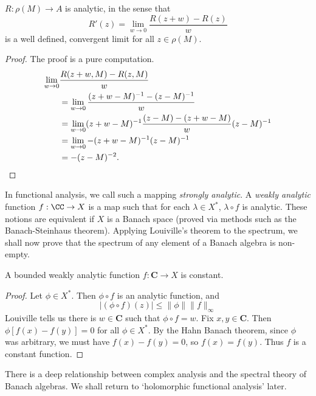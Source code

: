 \begin{lemma}
    $R: \rho(M) \to A$ is analytic, in the sense that
    \[ R'(z) = \lim_{w \to 0} \frac{R(z + w) - R(z)}{w} \]
    is a well defined, convergent limit for all $z \in \rho(M)$.
\end{lemma}
\begin{proof}
    The proof is a pure computation.
    \begin{align*}
        \lim_{w \to 0} &\frac{R(z + w, M) - R(z,M)}{w}\\
        &= \lim_{w \to 0} \frac{(z + w - M)^{-1} - (z - M)^{-1}}{w}\\
        &= \lim_{w \to 0} (z + w - M)^{-1} \frac{(z - M) - (z + w - M)}{w} (z - M)^{-1}\\
        &= \lim_{w \to 0} -(z + w - M)^{-1} (z - M)^{-1}\\
        &= -(z - M)^{-2}. \qedhere
    \end{align*}
\end{proof}

In functional analysis, we call such a mapping \emph{strongly analytic}. A \emph{weakly analytic} function $f: \CC \to X$ is a map such that for each $\lambda \in X^*$, $\lambda \circ f$ is analytic. These notions are equivalent if $X$ is a Banach space (proved via methods such as the Banach-Steinhaus theorem). Applying Louiville's theorem to the spectrum, we shall now prove that the spectrum of any element of a Banach algebra is non-empty.

\begin{lemma}
    A bounded weakly analytic function $f: \mathbf{C} \to X$ is constant.
\end{lemma}
\begin{proof}
    Let $\phi \in X^*$. Then $\phi \circ f$ is an analytic function, and
    \[ | (\phi \circ f)(z) | \leq \| \phi \| \| f \|_\infty \]
    Louiville tells us there is $w \in \mathbf{C}$ such that $\phi \circ f = w$. Fix $x,y \in \mathbf{C}$. Then $\phi[f(x) - f(y)] = 0$ for all $\phi \in X^*$. By the Hahn Banach theorem, since $\phi$ was arbitrary, we must have $f(x) - f(y) = 0$, so $f(x) = f(y)$. Thus $f$ is a constant function.
\end{proof}

There is a deep relationship between complex analysis and the spectral theory of Banach algebras. We shall return to `holomorphic functional analysis' later.

